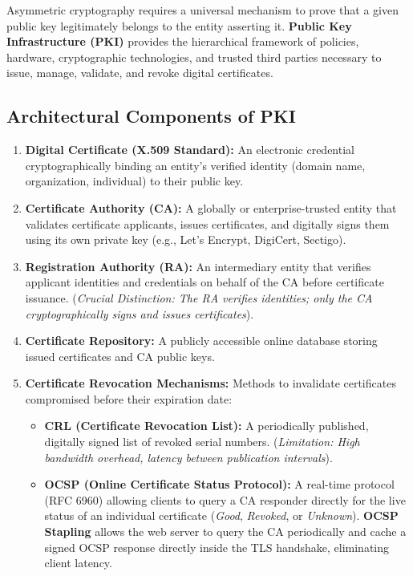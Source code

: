 Asymmetric cryptography requires a universal mechanism to prove that a given public key legitimately belongs to the entity asserting it. \textbf{Public Key Infrastructure (PKI)} provides the hierarchical framework of policies, hardware, cryptographic technologies, and trusted third parties necessary to issue, manage, validate, and revoke digital certificates.

\subsection{Architectural Components of PKI}

\begin{enumerate}
\item \textbf{Digital Certificate (X.509 Standard):} An electronic credential cryptographically binding an entity's verified identity (domain name, organization, individual) to their public key.
\item \textbf{Certificate Authority (CA):} A globally or enterprise-trusted entity that validates certificate applicants, issues certificates, and digitally signs them using its own private key (e.g., Let's Encrypt, DigiCert, Sectigo).
\item \textbf{Registration Authority (RA):} An intermediary entity that verifies applicant identities and credentials on behalf of the CA before certificate issuance. (\textit{Crucial Distinction: The RA verifies identities; only the CA cryptographically signs and issues certificates}).
\item \textbf{Certificate Repository:} A publicly accessible online database storing issued certificates and CA public keys.
\item \textbf{Certificate Revocation Mechanisms:} Methods to invalidate certificates compromised before their expiration date:
\begin{itemize}
\item \textbf{CRL (Certificate Revocation List):} A periodically published, digitally signed list of revoked serial numbers. (\textit{Limitation: High bandwidth overhead, latency between publication intervals}).
\item \textbf{OCSP (Online Certificate Status Protocol):} A real-time protocol (RFC 6960) allowing clients to query a CA responder directly for the live status of an individual certificate (\textit{Good}, \textit{Revoked}, or \textit{Unknown}). \textbf{OCSP Stapling} allows the web server to query the CA periodically and cache a signed OCSP response directly inside the TLS handshake, eliminating client latency.
\end{itemize}
\end{enumerate}

